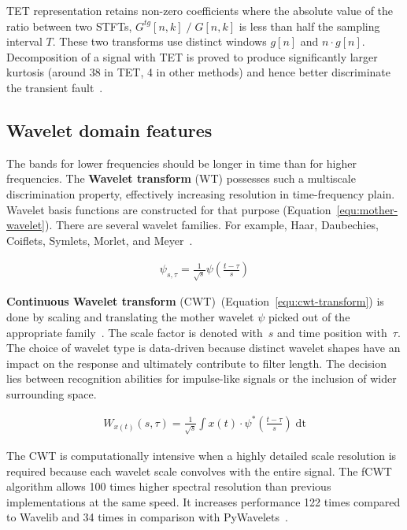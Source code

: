 TET representation retains non-zero coefficients where the absolute value of the ratio between two STFTs, $G^{tg}[n, k]\;/\;G[n, k]$ is less than half the sampling interval $T$. These two transforms use distinct windows $g[n]$ and $n \cdot g[n]$. Decomposition of a signal with TET is proved to produce significantly larger kurtosis (around 38 in TET, 4 in other methods) and hence better discriminate the transient fault~\cite{yu_concentrated_2020}.

\subsection{Wavelet domain features}
The bands for lower frequencies should be longer in time than for higher frequencies. The \textbf{Wavelet transform} (WT) possesses such a multiscale discrimination property, effectively increasing resolution in time-frequency plain. Wavelet basis functions are constructed for that purpose (Equation~\ref{equ:mother-wavelet}). There are several wavelet families. For example, Haar, Daubechies, Coiflets, Symlets, Morlet, and Meyer~\cite{nandi_condition_2019}.

\begin{ceqn}\begin{align}
\psi_{s, \tau} = \frac{1}{\sqrt{s}}\psi\left(\frac{t - \tau}{s}\right)
\label{equ:mother-wavelet}
\end{align}\end{ceqn}

\textbf{Continuous Wavelet transform} (CWT)~(Equation~\ref{equ:cwt-transform}) is done by scaling and translating the mother wavelet $\psi$ picked out of the appropriate family~\cite{nandi_condition_2019}. The scale factor is denoted with~$s$ and time position with~$\tau$. The choice of wavelet type is data-driven because distinct wavelet shapes have an impact on the response and ultimately contribute to filter length. The decision lies between recognition abilities for impulse-like signals or the inclusion of wider surrounding space.

\begin{ceqn}\begin{align}
W_{x(t)}(s, \tau) = \frac{1}{\sqrt{s}}\int x(t) \cdot \psi^*\left(\frac{t - \tau}{s}\right)\;\mathrm{dt}
\label{equ:cwt-transform}
\end{align}\end{ceqn}

The CWT is computationally intensive when a highly detailed scale resolution is required because each wavelet scale convolves with the entire signal. The fCWT algorithm allows 100 times higher spectral resolution than previous implementations at the same speed. It increases performance 122 times compared to Wavelib and 34 times in comparison with PyWavelets~\cite{arts_fast_2022}. 

